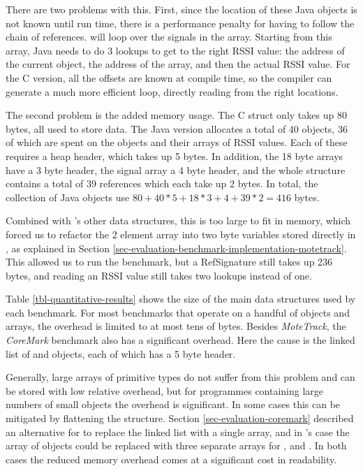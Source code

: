 There are two problems with this. First, since the location of these Java objects is not known until run time, there is a performance penalty for having to follow the chain of references.  will loop over the signals in the  array. Starting from this array, Java needs to do 3 lookups to get to the right RSSI value: the address of the current  object, the address of the  array, and then the actual RSSI value. For the C version, all the offsets are known at compile time, so the compiler can generate a much more efficient loop, directly reading from the right locations.

The second problem is the added memory usage. The C struct only takes up 80 bytes, all used to store data. The Java version allocates a total of 40 objects, 36 of which are spent on the  objects and their arrays of RSSI values. Each of these requires a heap header, which takes up 5 bytes. In addition, the 18 byte arrays have a 3 byte header, the signal array a 4 byte header, and the whole structure contains a total of 39 references which each take up 2 bytes. In total, the collection of Java objects use $80 + 40*5 + 18*3 + 4 + 39*2 = 416$ bytes.

Combined with 's other data structures, this is too large to fit in memory, which forced us to refactor the 2 element  array into two byte variables stored directly in , as explained in Section \ref{sec-evaluation-benchmark-implementation-motetrack}. This allowed us to run the benchmark, but a RefSignature still takes up 236 bytes, and reading an RSSI value still takes two lookups instead of one.

Table \ref{tbl-quantitative-results} shows the size of the main data structures used by each benchmark. For most benchmarks that operate on a handful of objects and arrays, the overhead is limited to at most tens of bytes. Besides \emph{MoteTrack}, the \emph{CoreMark} benchmark also has a significant overhead. Here the cause is the linked list of  and  objects, each of which has a 5 byte header.

Generally, large arrays of primitive types do not suffer from this problem and can be stored with low relative overhead, but for programmes containing large numbers of small objects the overhead is significant. In some cases this can be mitigated by flattening the structure. Section \ref{sec-evaluation-coremark} described an alternative for  to replace the linked list with a single array, and in 's case the array of  objects could be replaced with three separate arrays for ,  and . In both cases the reduced memory overhead comes at a significant cost in readability.




